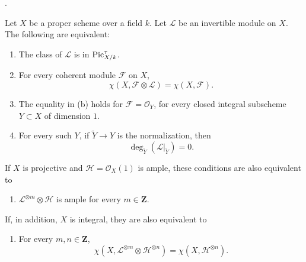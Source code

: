 \begin{theorem}
\label{theorem-picard-tau-numerical-criteria}
\begin{reference}
\cite[Supplement to Expos\'e 236, (viii), pp. 305--306]{FGA}.
\end{reference}
Let $X$ be a proper scheme over a field $k$. Let $\mathcal{L}$ be an
invertible module on $X$. The following are equivalent:
\begin{enumerate}
\item[(a)] The class of $\mathcal{L}$ is in
$\mathrm{Pic}_{X/k}^{\tau}$.
\item[(b)] For every coherent module $\mathcal{F}$ on $X$,
$$
\chi(X,\mathcal{F} \otimes \mathcal{L}) = \chi(X,\mathcal{F}).
$$
\item[(b$'$)] The equality in (b) holds for
$\mathcal{F} = \mathcal{O}_Y$, for every closed integral subscheme
$Y \subset X$ of dimension $1$.
\item[(c)] For every such $Y$, if $\widetilde Y \to Y$ is the normalization,
then
$$
\deg_{\widetilde Y}(\mathcal{L}|_{\widetilde Y}) = 0.
$$
\end{enumerate}
If $X$ is projective and $\mathcal{H} = \mathcal{O}_X(1)$ is ample, these
conditions are also equivalent to
\begin{enumerate}
\item[(d)] $\mathcal{L}^{\otimes m} \otimes \mathcal{H}$ is ample for every
$m \in \mathbf{Z}$.
\end{enumerate}
If, in addition, $X$ is integral, they are also equivalent to
\begin{enumerate}
\item[(e)] For every $m, n \in \mathbf{Z}$,
$$
\chi(X,\mathcal{L}^{\otimes m} \otimes \mathcal{H}^{\otimes n})
= \chi(X,\mathcal{H}^{\otimes n}).
$$
\end{enumerate}
\end{theorem}

